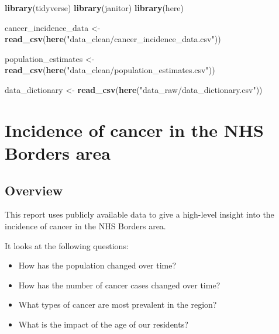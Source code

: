 \documentclass[
]{article}
\author{}
\date{\vspace{-2.5em}}
\newenvironment{Shaded}{\begin{snugshade}}{\end{snugshade}}
\newcommand{\KeywordTok}[1]{\textcolor[rgb]{0.13,0.29,0.53}{\textbf{#1}}}
\newcommand{\NormalTok}[1]{#1}
\newcommand{\StringTok}[1]{\textcolor[rgb]{0.31,0.60,0.02}{#1}}
\begin{document}
\begin{Shaded}
\begin{Highlighting}[]
\KeywordTok{library}\NormalTok{(tidyverse)}
\KeywordTok{library}\NormalTok{(janitor)}
\KeywordTok{library}\NormalTok{(here)}
\end{Highlighting}
\end{Shaded}

\begin{Shaded}
\begin{Highlighting}[]
\NormalTok{cancer_incidence_data <-}\StringTok{ }
\StringTok{ }\KeywordTok{read_csv}\NormalTok{(}\KeywordTok{here}\NormalTok{(}\StringTok{"data_clean/cancer_incidence_data.csv"}\NormalTok{))}

\NormalTok{population_estimates <-}\StringTok{ }
\StringTok{ }\KeywordTok{read_csv}\NormalTok{(}\KeywordTok{here}\NormalTok{(}\StringTok{"data_clean/population_estimates.csv"}\NormalTok{))}

\NormalTok{data_dictionary <-}\StringTok{ }\KeywordTok{read_csv}\NormalTok{(}\KeywordTok{here}\NormalTok{(}\StringTok{"data_raw/data_dictionary.csv"}\NormalTok{)) }
\end{Highlighting}
\end{Shaded}

\hypertarget{incidence-of-cancer-in-the-nhs-borders-area}{%
\section{\texorpdfstring{{Incidence of cancer in the NHS Borders
area}}{Incidence of cancer in the NHS Borders area}}\label{incidence-of-cancer-in-the-nhs-borders-area}}

\hypertarget{overview}{%
\subsection{\texorpdfstring{{Overview}}{Overview}}\label{overview}}

This report uses publicly available data to give a high-level insight
into the incidence of cancer in the NHS Borders area.

It looks at the following questions:

\begin{itemize}
\item
  How has the population changed over time?
\item
  How has the number of cancer cases changed over time?
\item
  What types of cancer are most prevalent in the region?
\item
  What is the impact of the age of our residents?
\end{itemize}
\end{document}
